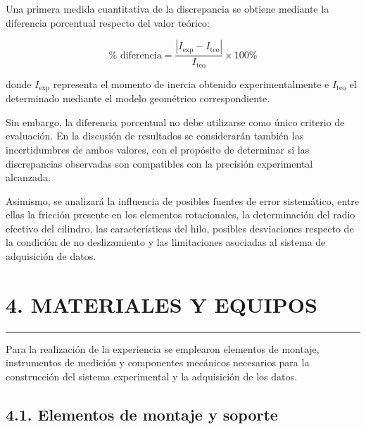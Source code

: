 \documentclass[11pt,a4paper]{article}
\newcommand{\sectionline}{%
    \vspace{-0.6em}
    \noindent\rule{\textwidth}{0.5pt}
    \vspace{0.5em}
}
\begin{document}
Una primera medida cuantitativa de la discrepancia se obtiene mediante la
diferencia porcentual respecto del valor teórico:

\begin{equation}
\%\text{ diferencia}
=
\frac{
\left|I_{\mathrm{exp}}-I_{\mathrm{teo}}\right|
}{
I_{\mathrm{teo}}
}
\times 100\%
\label{eq:diferencia_porcentual}
\end{equation}

donde \(I_{\mathrm{exp}}\) representa el momento de inercia obtenido
experimentalmente e \(I_{\mathrm{teo}}\) el determinado mediante el modelo
geométrico correspondiente.

Sin embargo, la diferencia porcentual no debe utilizarse como único
criterio de evaluación. En la discusión de resultados se considerarán
también las incertidumbres de ambos valores, con el propósito de determinar
si las discrepancias observadas son compatibles con la precisión
experimental alcanzada.

Asimismo, se analizará la influencia de posibles fuentes de error
sistemático, entre ellas la fricción presente en los elementos rotacionales,
la determinación del radio efectivo del cilindro, las características del
hilo, posibles desviaciones respecto de la condición de no deslizamiento y
las limitaciones asociadas al sistema de adquisición de datos.


\newpage

\section*{4. MATERIALES Y EQUIPOS}
\sectionline

Para la realización de la experiencia se emplearon elementos de montaje,
instrumentos de medición y componentes mecánicos necesarios para la
construcción del sistema experimental y la adquisición de los datos.


\subsection*{4.1. Elementos de montaje y soporte}
\end{document}
